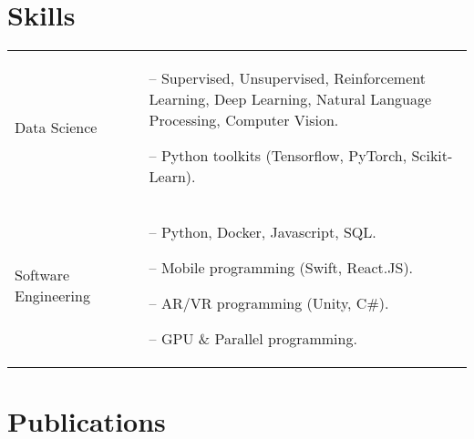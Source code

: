 \documentclass[a4paper,12pt]{article}
\begin{document}
\section{Skills}
\begin{tabularx}{\linewidth}{@{}l X@{}}
Data Science &  \normalsize{

\begin{minipage}[t]{\linewidth}
    \begin{itemize}[nosep,after=\strut, leftmargin=1em, itemsep=3pt]
    \item[--]Supervised, Unsupervised, Reinforcement Learning, Deep Learning, Natural Language Processing, Computer Vision.
    \item[--]Python toolkits (Tensorflow, PyTorch, Scikit-Learn). 
    \end{itemize}
    \end{minipage}}
\\
Software Engineering  &  \normalsize{
\begin{minipage}[t]{\linewidth}
    \begin{itemize}[nosep,after=\strut, leftmargin=1em, itemsep=3pt]
    \item[--]Python, Docker, Javascript, SQL.
    \item[--]Mobile programming (Swift, React.JS). 
    \item[--]AR/VR programming (Unity, C\#).
    \item[--] GPU \& Parallel programming.
    \end{itemize}
    \end{minipage}}
\\


\end{tabularx}

\section{Publications}
\begin{refsection}
\nocite{*}
\printbibliography[heading=none]
\end{refsection}

\vfill
{}
\end{document}
